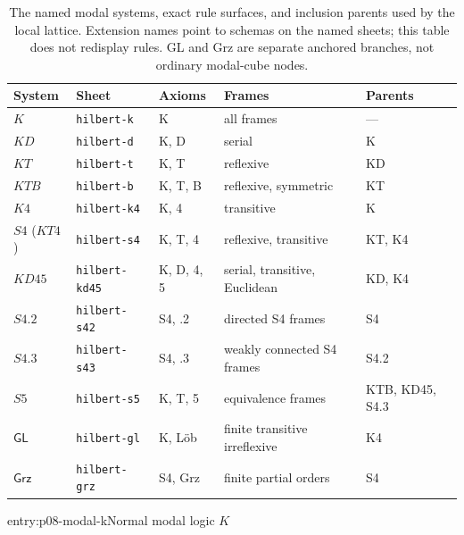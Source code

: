 \begin{table}[!htbp]
\centering
\small
\begin{tabular}{@{}p{}p{}p{}p{}p{}@{}}
\toprule
System & Sheet & Axioms & Frames & Parents \\
\midrule
\(K\) & \texttt{hilbert-k} & K & all frames & --- \\
\(KD\) & \texttt{hilbert-d} & K, D & serial & K \\
\(KT\) & \texttt{hilbert-t} & K, T & reflexive & KD \\
\(KTB\) & \texttt{hilbert-b} & K, T, B & reflexive, symmetric & KT \\
\(K4\) & \texttt{hilbert-k4} & K, 4 & transitive & K \\
\(S4\) (\(KT4\)) & \texttt{hilbert-s4} & K, T, 4 & reflexive, transitive & KT, K4 \\
\(KD45\) & \texttt{hilbert-kd45} & K, D, 4, 5 & serial, transitive, Euclidean & KD, K4 \\
\(S4.2\) & \texttt{hilbert-s42} & S4, .2 & directed S4 frames & S4 \\
\(S4.3\) & \texttt{hilbert-s43} & S4, .3 & weakly connected S4 frames & S4.2 \\
\(S5\) & \texttt{hilbert-s5} & K, T, 5 & equivalence frames & KTB, KD45, S4.3 \\
\(\mathsf{GL}\) & \texttt{hilbert-gl} & K, L\"ob & finite transitive irreflexive & K4 \\
\(\mathsf{Grz}\) & \texttt{hilbert-grz} & S4, Grz & finite partial orders & S4 \\
\bottomrule
\end{tabular}
\caption{The named modal systems, exact rule surfaces, and inclusion parents
used by the local lattice.  Extension names point to schemas
on the named sheets; this table does not redisplay rules.  GL and Grz are
separate anchored branches, not ordinary modal-cube nodes.}
\label{tab:p08-modal-systems}
\end{table}

\begin{systementry}{entry:p08-modal-k}{Normal modal logic \(K\)}
\end{systementry}

